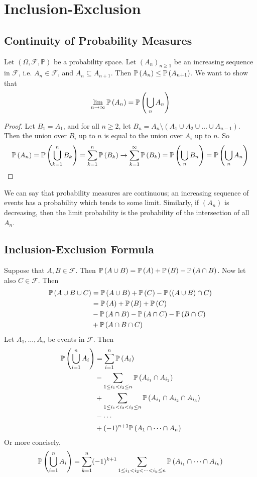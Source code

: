 \documentclass{article}
\begin{document}
\section{Inclusion-Exclusion}
\subsection{Continuity of Probability Measures}
Let $(\Omega, \mathcal F, \mathbb P)$ be a probability space. Let $(A_n)_{n \geq 1}$ be an increasing sequence in $\mathcal F$, i.e. $A_n \in \mathcal F$, and $A_n \subseteq A_{n+1}$. Then $\mathbb{P}\left({A_n}\right) \leq \mathbb{P}\left({A_{n+1}}\right)$. We want to show that
\[ \lim_{n \to \infty}\mathbb{P}\left({A_n}\right) = \mathbb{P}\left({\bigcup_n A_n}\right) \]
\begin{proof}
	Let $B_1 = A_1$, and for all $n \geq 2$, let $B_n = A_n \setminus (A_1 \cup A_2 \cup \dots \cup A_{n-1})$. Then the union over $B_i$ up to $n$ is equal to the union over $A_i$ up to $n$. So
	\[ \mathbb{P}\left({A_n}\right) = \mathbb{P}\left({\bigcup_{k=1}^n B_k}\right) = \sum_{k=1}^n \mathbb{P}\left({B_k}\right) \to \sum_{k=1}^\infty \mathbb{P}\left({B_k}\right) = \mathbb{P}\left({\bigcup_n B_n}\right) = \mathbb{P}\left({\bigcup_n A_n}\right) \]
\end{proof}
\noindent We can say that probability measures are continuous; an increasing sequence of events has a probability which tends to some limit. Similarly, if $(A_n)$ is decreasing, then the limit probability is the probability of the intersection of all $A_n$.

\subsection{Inclusion-Exclusion Formula}
Suppose that $A, B \in \mathcal F$. Then $\mathbb{P}\left({A \cup B}\right) = \mathbb{P}\left({A}\right) + \mathbb{P}\left({B}\right) - \mathbb{P}\left({A \cap B}\right)$. Now let also $C \in \mathcal F$. Then
\begin{align*}
	\mathbb{P}\left({A \cup B \cup C}\right) & = \mathbb{P}\left({A \cup B}\right) + \mathbb{P}\left({C}\right) - \mathbb{P}\left({(A \cup B) \cap C}\right) \\
	                       & = \mathbb{P}\left({A}\right) + \mathbb{P}\left({B}\right) + \mathbb{P}\left({C}\right)                        \\
	                       & - \mathbb{P}\left({A \cap B}\right) - \mathbb{P}\left({A \cap C}\right) - \mathbb{P}\left({B \cap C}\right)   \\
	                       & + \mathbb{P}\left({A \cap B \cap C}\right)
\end{align*}
Let $A_1, \dots, A_n$ be events in $\mathcal F$. Then
\begin{align*}
	\mathbb{P}\left({\bigcup_{i=1}^n A_i}\right) & = \sum_{i=1}^n \mathbb{P}\left({A_i}\right)                                                      \\
	                           & - \sum_{1 \leq i_1 < i_2 \leq n}\mathbb{P}\left({A_{i_1} \cap A_{i_2}}\right)                    \\
	                           & + \sum_{1 \leq i_1 < i_2 < i_3 \leq n}\mathbb{P}\left({A_{i_1} \cap A_{i_2} \cap A_{i_3}}\right) \\
	                           & - \cdots                                                                       \\
	                           & + (-1)^{n+1}\mathbb{P}\left({A_1 \cap \dots \cap A_n}\right)
\end{align*}
Or more concisely,
\[ \mathbb{P}\left({\bigcup_{i=1}^n A_i}\right) = \sum_{k=1}^n (-1)^{k+1} \sum_{1 \leq i_1 < i_2 < \dots < i_k \leq n} \mathbb{P}\left({A_{i_1} \cap \dots \cap A_{i_k}}\right) \]
\end{document}

